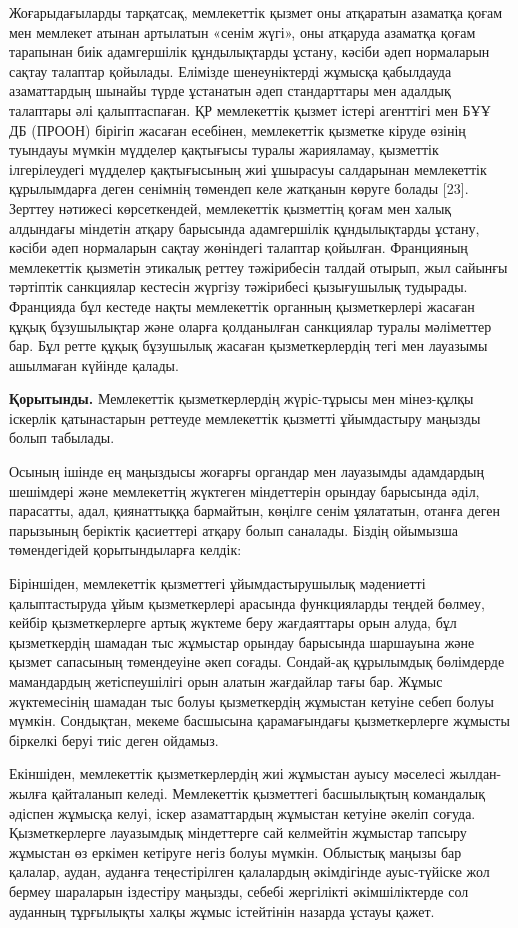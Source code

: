 Жоғарыдағыларды тарқатсақ, мемлекеттік қызмет оны атқаратын азаматқа
қоғам мен мемлекет атынан артылатын «сенім жүгі», оны атқаруда азаматқа
қоғам тарапынан биік адамгершілік құндылықтарды ұстану, кәсіби әдеп
нормаларын сақтау талаптар қойылады. Елімізде шенеуніктерді жұмысқа
қабылдауда азаматтардың шынайы түрде ұстанатын әдеп стандарттары мен
адалдық талаптары әлі қалыптаспаған. ҚР мемлекеттік қызмет істері
агенттігі мен БҰҰ ДБ (ПРООН) бірігіп жасаған есебінен, мемлекеттік
қызметке кіруде өзінің туындауы мүмкін мүдделер қақтығысы туралы
жарияламау, қызметтік ілгерілеудегі мүдделер қақтығысының жиі ұшырасуы
салдарынан мемлекеттік құрылымдарға деген сенімнің төмендеп келе
жатқанын көруге болады {[}23{]}. Зерттеу нәтижесі көрсеткендей,
мемлекеттік қызметтің қоғам мен халық алдындағы міндетін атқару
барысында адамгершілік құндылықтарды ұстану, кәсіби әдеп нормаларын
сақтау жөніндегі талаптар қойылған. Францияның мемлекеттік қызметін
этикалық реттеу тәжірибесін талдай отырып, жыл сайынғы тәртіптік
санкциялар кестесін жүргізу тәжірибесі қызығушылық тудырады. Францияда
бұл кестеде нақты мемлекеттік органның қызметкерлері жасаған құқық
бұзушылықтар және оларға қолданылған санкциялар туралы мәліметтер бар.
Бұл ретте құқық бұзушылық жасаған қызметкерлердің тегі мен лауазымы
ашылмаған күйінде қалады.

{\bfseries Қорытынды.} Мемлекеттік қызметкерлердің жүріс-тұрысы мен
мінез-құлқы іскерлік қатынастарын реттеуде мемлекеттік қызметті
ұйымдастыру маңызды болып табылады.

Осының ішінде ең маңыздысы жоғарғы органдар мен лауазымды адамдардың
шешімдері және мемлекеттің жүктеген міндеттерін орындау барысында әділ,
парасатты, адал, қиянаттыққа бармайтын, көңілге сенім ұялататын, отанға
деген парызының беріктік қасиеттері атқару болып саналады. Біздің
ойымызша төмендегідей қорытындыларға келдік:

Біріншіден, мемлекеттік қызметтегі ұйымдастырушылық мәдениетті
қалыптастыруда ұйым қызметкерлері арасында функцияларды теңдей бөлмеу,
кейбір қызметкерлерге артық жүктеме беру жағдаяттары орын алуда, бұл
қызметкердің шамадан тыс жұмыстар орындау барысында шаршауына және
қызмет сапасының төмендеуіне әкеп соғады. Сондай-ақ құрылымдық
бөлімдерде мамандардың жетіспеушілігі орын алатын жағдайлар тағы бар.
Жұмыс жүктемесінің шамадан тыс болуы қызметкердің жұмыстан кетуіне себеп
болуы мүмкін. Сондықтан, мекеме басшысына қарамағындағы қызметкерлерге
жұмысты біркелкі беруі тиіс деген ойдамыз.

Екіншіден, мемлекеттік қызметкерлердің жиі жұмыстан ауысу мәселесі
жылдан-жылға қайталанып келеді. Мемлекеттік қызметтегі басшылықтың
командалық әдіспен жұмысқа келуі, іскер азаматтардың жұмыстан кетуіне
әкеліп соғуда. Қызметкерлерге лауазымдық міндеттерге сай келмейтін
жұмыстар тапсыру жұмыстан өз еркімен кетіруге негіз болуы мүмкін.
Облыстық маңызы бар қалалар, аудан, ауданға теңестірілген қалалардың
әкімдігінде ауыс-түйіске жол бермеу шараларын іздестіру маңызды, себебі
жергілікті әкімшіліктерде сол ауданның тұрғылықты халқы жұмыс істейтінін
назарда ұстауы қажет.

